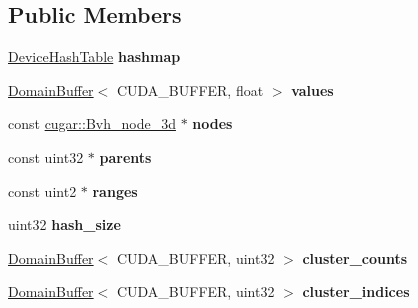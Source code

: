 \subsection*{Public Members}
\begin{DoxyCompactItemize}
\item 
\mbox{\label{struct_adaptive_clustered_r_l_storage_adf22a8c93389d05ec4d40c95ee6bc30c}} 
\hyperlink{struct_device_hash_table}{Device\+Hash\+Table} {\bfseries hashmap}
\item 
\mbox{\label{struct_adaptive_clustered_r_l_storage_aee79c4cc301d560c11d26021f8749890}} 
\hyperlink{class_domain_buffer}{Domain\+Buffer}$<$ C\+U\+D\+A\+\_\+\+B\+U\+F\+F\+ER, float $>$ {\bfseries values}
\item 
\mbox{\label{struct_adaptive_clustered_r_l_storage_acf55d559910053dc3911f7e8b6efebba}} 
const \hyperlink{structcugar_1_1_bvh__node__3d}{cugar\+::\+Bvh\+\_\+node\+\_\+3d} $\ast$ {\bfseries nodes}
\item 
\mbox{\label{struct_adaptive_clustered_r_l_storage_a2c387808743c18bf40852b11643c6575}} 
const uint32 $\ast$ {\bfseries parents}
\item 
\mbox{\label{struct_adaptive_clustered_r_l_storage_a3917c73323fcb3a7d604a17a3fa22c50}} 
const uint2 $\ast$ {\bfseries ranges}
\item 
\mbox{\label{struct_adaptive_clustered_r_l_storage_a5272dad0e83b87bc2fc2c8ee61d510a2}} 
uint32 {\bfseries hash\+\_\+size}
\item 
\mbox{\label{struct_adaptive_clustered_r_l_storage_ae0623f5fc45e0c073d08f8578593f344}} 
\hyperlink{class_domain_buffer}{Domain\+Buffer}$<$ C\+U\+D\+A\+\_\+\+B\+U\+F\+F\+ER, uint32 $>$ {\bfseries cluster\+\_\+counts}
\item 
\mbox{\label{struct_adaptive_clustered_r_l_storage_a149684fd556c6b7e7a8c92ea89a0a5b1}} 
\hyperlink{class_domain_buffer}{Domain\+Buffer}$<$ C\+U\+D\+A\+\_\+\+B\+U\+F\+F\+ER, uint32 $>$ {\bfseries cluster\+\_\+indices}

\end{DoxyCompactItemize}
